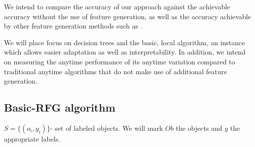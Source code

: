 \documentclass[12pt, a4paper]{article}
\theoremstyle{definition}
\begin{document}
We intend to compare the accuracy of our approach against the achievable accuracy without the use of feature generation, as well as the accuracy achievable by other feature generation methods such as \citet{gabrilovich2006overcoming}.

We will place focus on decision trees and the basic, local algorithm, an instance which allows easier adaptation as well as interpretability.
In addition, we intend on measuring the anytime performance of its anytime variation compared to traditional anytime algorithms that do not make use of additional feature generation.




\begin{appendices}
\pagebreak

%
%
%
%
%
%
%
%

\section{Basic-RFG algorithm} \label{app:2}
\begin{algorithm}[H]
$S=\{(o_{i},y_{i})\}$- set of labeled objects. We will mark $Ob$ the objects and $y$ the appropriate labels.


\end{algorithm}
\end{appendices}
\end{document}
